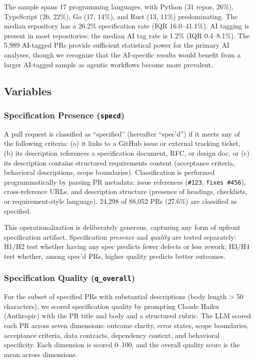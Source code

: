 \documentclass[a4paper,UKenglish,cleveref,autoref,thm-restate]{lipics-v2021}
\begin{document}
The sample spans 17 programming languages, with Python (31 repos, 26\%), TypeScript (26, 22\%), Go (17, 14\%), and Rust (13, 11\%) predominating. The median repository has a 26.2\% specification rate (IQR 16.0--41.1\%). AI tagging is present in most repositories: the median AI tag rate is 1.2\% (IQR 0.4--8.1\%). The 5,989 AI-tagged PRs provide sufficient statistical power for the primary AI analyses, though we recognize that the AI-specific results would benefit from a larger AI-tagged sample as agentic workflows become more prevalent.

\subsection{Variables}

\subsubsection{Specification Presence (\texttt{specd})}

A pull request is classified as ``specified'' (hereafter ``spec'd'') if it meets any of the following criteria: (a) it links to a GitHub issue or external tracking ticket, (b) its description references a specification document, RFC, or design doc, or (c) its description contains structured requirements content (acceptance criteria, behavioral descriptions, scope boundaries). Classification is performed programmatically by parsing PR metadata: issue references (\texttt{\#123}, \texttt{fixes \#456}), cross-reference URLs, and description structure (presence of headings, checklists, or requirement-style language). 24,298 of 88,052 PRs (27.6\%) are classified as specified.

This operationalization is deliberately generous, capturing any form of upfront specification artifact. Specification \emph{presence} and \emph{quality} are tested separately: H1/H2 test whether having any spec predicts fewer defects or less rework; H3/H4 test whether, among spec'd PRs, higher quality predicts better outcomes.

\subsubsection{Specification Quality (\texttt{q\_overall})}

For the subset of specified PRs with substantial descriptions (body length > 50 characters), we scored specification quality by prompting Claude Haiku (Anthropic) with the PR title and body and a structured rubric. The LLM scored each PR across seven dimensions: outcome clarity, error states, scope boundaries, acceptance criteria, data contracts, dependency context, and behavioral specificity. Each dimension is scored 0--100, and the overall quality score is the mean across dimensions.
\end{document}
